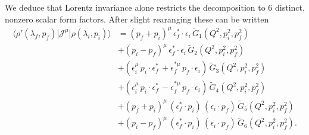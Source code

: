 We deduce that Lorentz invariance alone restricts the decomposition to $6$ distinct, nonzero scalar form factors. After slight rearanging these can be written
\begin{equation}
\begin{split}
\langle\rho'(\lambda_f,p_f)|{\mathcal{J}}^{\mu}|\rho(\lambda_i,p_i)\rangle
&=
(p_f+p_i)^\mu \,\epsilon_f^*\cdot \epsilon_i\, \widetilde{G}_1(Q^2,p_i^2,p_f^2)
\\&
+(p_i-p_f)^\mu \,\epsilon_f^*\cdot \epsilon_i\,\widetilde{G}_2(Q^2,p_i^2,p_f^2)
\\&
+\left(\epsilon_i^\mu\, p_i\cdot \epsilon_f^*\,+\epsilon_f^{*\mu}\, p_f\cdot \epsilon_i\right)
\,\widetilde{G}_3(Q^2,p_i^2,p_f^2)
\\&
+\left(\epsilon_i^\mu\, p_i\cdot \epsilon_f^*\,-\epsilon_f^{*\mu}\, p_f\cdot \epsilon_i\right)
\,\widetilde{G}_4(Q^2,p_i^2,p_f^2)
\\&
+(p_f+p_i)^\mu \,(\epsilon_f^*\cdot p_i)\,(\epsilon_i\cdot p_f)\,\widetilde{G}_5(Q^2,p_i^2,p_f^2)
\\&
+(p_i-p_f)^\mu \,(\epsilon_f^*\cdot p_i)\,(\epsilon_i\cdot p_f)\,\widetilde{G}_6(Q^2,p_i^2,p_f^2).
\end{split}
\end{equation}

